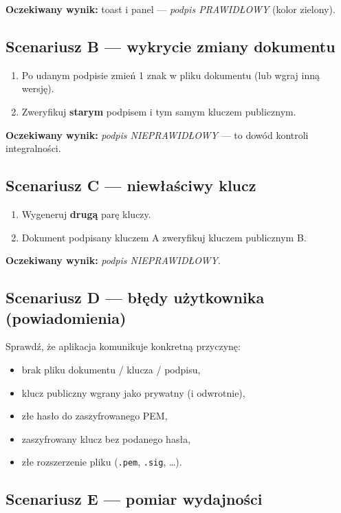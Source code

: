 \documentclass[12pt,a4paper]{article}
\begin{document}
\textbf{Oczekiwany wynik:} toast i panel --- \textit{podpis PRAWIDŁOWY} (kolor zielony).

\subsection{Scenariusz B --- wykrycie zmiany dokumentu}

\begin{enumerate}[leftmargin=*]
  \item Po udanym podpisie zmień 1 znak w pliku dokumentu (lub wgraj inną wersję).
  \item Zweryfikuj \textbf{starym} podpisem i tym samym kluczem publicznym.
\end{enumerate}

\textbf{Oczekiwany wynik:} \textit{podpis NIEPRAWIDŁOWY} --- to dowód kontroli integralności.

\subsection{Scenariusz C --- niewłaściwy klucz}

\begin{enumerate}[leftmargin=*]
  \item Wygeneruj \textbf{drugą} parę kluczy.
  \item Dokument podpisany kluczem A zweryfikuj kluczem publicznym B.
\end{enumerate}

\textbf{Oczekiwany wynik:} \textit{podpis NIEPRAWIDŁOWY}.

\subsection{Scenariusz D --- błędy użytkownika (powiadomienia)}

Sprawdź, że aplikacja komunikuje konkretną przyczynę:
\begin{itemize}[leftmargin=*]
  \item brak pliku dokumentu / klucza / podpisu,
  \item klucz publiczny wgrany jako prywatny (i odwrotnie),
  \item złe hasło do zaszyfrowanego PEM,
  \item zaszyfrowany klucz bez podanego hasła,
  \item złe rozszerzenie pliku (\texttt{.pem}, \texttt{.sig}, \ldots).
\end{itemize}

\subsection{Scenariusz E --- pomiar wydajności}
\end{document}
